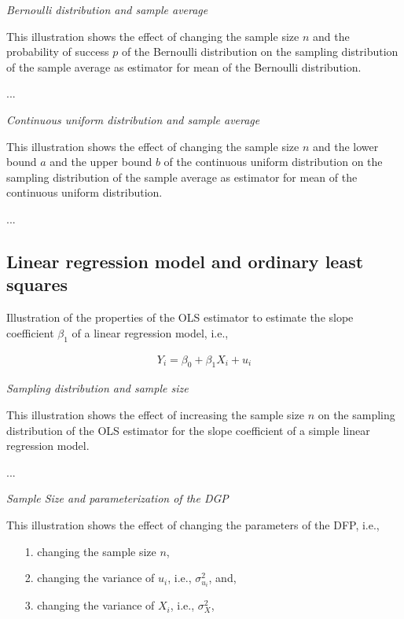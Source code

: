 \documentclass[12pt]{article}
\begin{document}
\emph{Bernoulli distribution and sample average}


This illustration shows the effect of changing the sample size $n$ and the probability of success $p$ of the Bernoulli distribution on the sampling distribution of the sample average as estimator for mean of the Bernoulli distribution.

...

\emph{Continuous uniform distribution and sample average}


This illustration shows the effect of changing the sample size $n$ and the lower bound $a$ and the upper bound $b$ of the continuous uniform distribution on the sampling distribution of the sample average as estimator for mean of the continuous uniform distribution.

...

\subsection{Linear regression model and ordinary least squares}\label{SecWha02}

Illustration of the properties of the OLS estimator to estimate the slope coefficient $\beta_{1}$ of a linear regression model, i.e.,

\begin{align}
	Y_{i} = \beta_{0} + \beta_{1} X_{i} + u_{i}
\end{align}

\emph{Sampling distribution and sample size}


This illustration shows the effect of increasing the sample size $n$ on the sampling distribution of the OLS estimator for the slope coefficient of a simple linear regression model.

...

\emph{Sample Size and parameterization of the DGP}


This illustration shows the effect of changing the parameters of the DFP, i.e.,  

\begin{itemize}
	\item[1.] changing the sample size $n$,
	\item[2.] changing the variance of $u_{i}$, i.e., $\sigma_{u_{i}}^{2}$, and,
	\item[3.] changing the variance of $X_{i}$, i.e., $\sigma_{X}^{2}$, 
\end{itemize}
\end{document}
